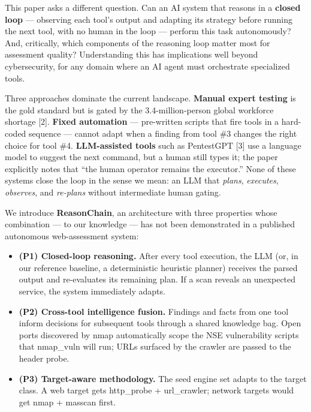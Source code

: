 \documentclass[
]{article}
\begin{document}
This paper asks a different question. Can an AI system that reasons in a
\textbf{closed loop} --- observing each tool's output and adapting its
strategy before running the next tool, with no human in the loop ---
perform this task autonomously? And, critically, which components of the
reasoning loop matter most for assessment quality? Understanding this
has implications well beyond cybersecurity, for any domain where an AI
agent must orchestrate specialized tools.

Three approaches dominate the current landscape. \textbf{Manual expert
testing} is the gold standard but is gated by the 3.4-million-person
global workforce shortage {[}2{]}. \textbf{Fixed automation} ---
pre-written scripts that fire tools in a hard-coded sequence --- cannot
adapt when a finding from tool \#3 changes the right choice for tool
\#4. \textbf{LLM-assisted tools} such as PentestGPT {[}3{]} use a
language model to suggest the next command, but a human still types it;
the paper explicitly notes that ``the human operator remains the
executor.'' None of these systems close the loop in the sense we mean:
an LLM that \emph{plans}, \emph{executes}, \emph{observes}, and
\emph{re-plans} without intermediate human gating.

We introduce \textbf{ReasonChain}, an architecture with three properties
whose combination --- to our knowledge --- has not been demonstrated in
a published autonomous web-assessment system:

\begin{itemize}
\item
  \textbf{(P1) Closed-loop reasoning.} After every tool execution, the
  LLM (or, in our reference baseline, a deterministic heuristic planner)
  receives the parsed output and re-evaluates its remaining plan. If a
  scan reveals an unexpected service, the system immediately adapts.
\item
  \textbf{(P2) Cross-tool intelligence fusion.} Findings and facts from
  one tool inform decisions for subsequent tools through a shared
  knowledge bag. Open ports discovered by nmap automatically scope the
  NSE vulnerability scripts that nmap\_vuln will run; URLs surfaced by
  the crawler are passed to the header probe.
\item
  \textbf{(P3) Target-aware methodology.} The seed engine set adapts to
  the target class. A web target gets http\_probe + url\_crawler;
  network targets would get nmap + masscan first.
\end{itemize}
\end{document}
